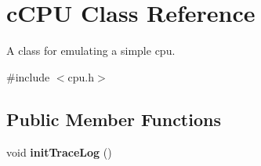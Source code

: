\hypertarget{classcCPU}{\section{c\-C\-P\-U \-Class \-Reference}
\label{d2/dc6/classcCPU}
}


\-A class for emulating a simple cpu.  




{\ttfamily \#include $<$cpu.\-h$>$}

\subsection*{\-Public \-Member \-Functions}
\begin{DoxyCompactItemize}
\item 
\hypertarget{classcCPU_a8ed9b15ed0e8ae225eb821ac0974ced0}{void {\bfseries init\-Trace\-Log} ()}\label{d2/dc6/classcCPU_a8ed9b15ed0e8ae225eb821ac0974ced0}


\end{DoxyCompactItemize}

